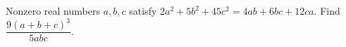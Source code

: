 Nonzero real numbers $a,b,c$ satisfy $2a^2+5b^2+45c^2=4ab+6bc+12ca$. Find $\dfrac{9(a+b+c)^3}{5abc}$.
